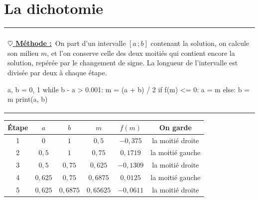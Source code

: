 \documentclass[a4paper,11pt,openany]{book}
\makeatletter
\newenvironment{cadre}%
 {\par\vspace{2mm}\noindent\begin{tabular}{|@{\hspace{4mm}}p{0.93\textwidth}@{\hspace{4mm}}|}
  \hline \\[-2mm]}%
 {\\[2mm] \hline \end{tabular}\par\vspace{3mm}}
\newcommand{\methode}{\textbf{\underline{$\heartsuit$ Méthode :}}~}
\renewcommand{\arraystretch}{1.4}
\makeatother
\begin{document}
\section{La dichotomie}

\begin{cadre}
\methode On part d'un intervalle $[a\,;b]$ contenant la solution, on calcule son milieu $m$, et l'on conserve celle des deux moitiés qui contient encore la solution, repérée par le changement de signe. La longueur de l'intervalle est divisée par deux à chaque étape.
\begin{python}
a, b = 0, 1
while b - a > 0.001:
    m = (a + b) / 2
    if f(m) <= 0:
        a = m
    else:
        b = m
print(a, b)
\end{python}
\end{cadre}

\begin{center}
\renewcommand{\arraystretch}{1.4}
\begin{tabular}{|c|c|c|c|c|c|}
\hline
\rowcolor{orange!50} \textbf{Étape} & $a$ & $b$ & $m$ & $f(m)$ & \textbf{On garde} \\
\hline
1 & $0$ & $1$ & $0{,}5$ & $-0{,}375$ & la moitié droite \\
\hline
2 & $0{,}5$ & $1$ & $0{,}75$ & $0{,}1719$ & la moitié gauche \\
\hline
3 & $0{,}5$ & $0{,}75$ & $0{,}625$ & $-0{,}1309$ & la moitié droite \\
\hline
4 & $0{,}625$ & $0{,}75$ & $0{,}6875$ & $0{,}0125$ & la moitié gauche \\
\hline
5 & $0{,}625$ & $0{,}6875$ & $0{,}65625$ & $-0{,}0611$ & la moitié droite \\
\hline
\end{tabular}
\end{center}

\begin{center}
\end{center}
\end{document}
